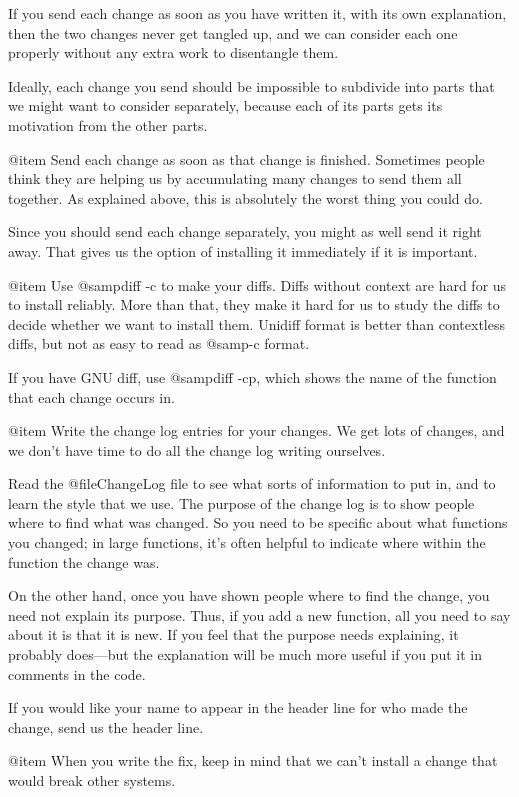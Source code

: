 If you send each change as soon as you have written it, with its own
explanation, then the two changes never get tangled up, and we can
consider each one properly without any extra work to disentangle them.

Ideally, each change you send should be impossible to subdivide into
parts that we might want to consider separately, because each of its
parts gets its motivation from the other parts.

@item
Send each change as soon as that change is finished.  Sometimes people
think they are helping us by accumulating many changes to send them all
together.  As explained above, this is absolutely the worst thing you
could do.

Since you should send each change separately, you might as well send it
right away.  That gives us the option of installing it immediately if it
is important.

@item
Use @samp{diff -c} to make your diffs.  Diffs without context are hard
for us to install reliably.  More than that, they make it hard for us to
study the diffs to decide whether we want to install them.  Unidiff
format is better than contextless diffs, but not as easy to read as
@samp{-c} format.

If you have GNU diff, use @samp{diff -cp}, which shows the name of the
function that each change occurs in.

@item
Write the change log entries for your changes.  We get lots of changes,
and we don't have time to do all the change log writing ourselves.

Read the @file{ChangeLog} file to see what sorts of information to put
in, and to learn the style that we use.  The purpose of the change log
is to show people where to find what was changed.  So you need to be
specific about what functions you changed; in large functions, it's
often helpful to indicate where within the function the change was.

On the other hand, once you have shown people where to find the change,
you need not explain its purpose.  Thus, if you add a new function, all
you need to say about it is that it is new.  If you feel that the
purpose needs explaining, it probably does---but the explanation will be
much more useful if you put it in comments in the code.

If you would like your name to appear in the header line for who made
the change, send us the header line.

@item
When you write the fix, keep in mind that we can't install a change that
would break other systems.

